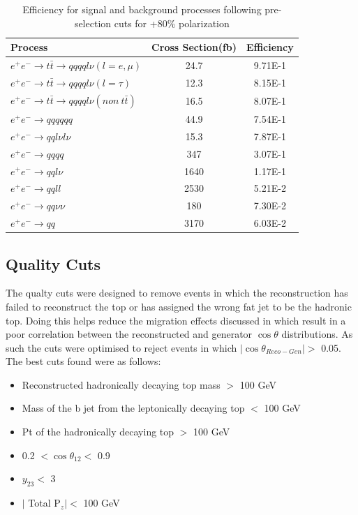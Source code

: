 \begin{table}
  \centering
  \begin{tabular}{l | c | c }
    \toprule
    Process     & Cross Section(fb) & Efficiency \\
    \midrule
     $e^+e^-\rightarrow t\bar{t} \rightarrow qqqql\nu (l=e,\mu)$& 24.7 & 9.71E-1\\
    \midrule
    $e^+e^-\rightarrow t\bar{t} \rightarrow qqqql\nu (l=\tau)$& 12.3 & 8.15E-1\\
    \midrule
    $e^+e^-\rightarrow t\bar{t} \rightarrow qqqql\nu (non ~ t\bar{t})$& 16.5 & 8.07E-1\\
    \midrule
    $e^+e^-\rightarrow qqqqqq$ & 44.9 &  7.54E-1\\
    \midrule
    $e^+e^-\rightarrow qql\nu l\nu$ & 15.3  & 7.87E-1\\
    \midrule
    $e^+e^-\rightarrow qqqq$ & 347 &  3.07E-1\\
    \midrule
    $e^+e^-\rightarrow qql\nu$ & 1640 &  1.17E-1\\
    \midrule
    $e^+e^-\rightarrow qqll$ & 2530 &  5.21E-2\\
    \midrule
    $e^+e^-\rightarrow qq\nu\nu$ & 180 & 7.30E-2 \\
    \midrule
    $e^+e^-\rightarrow qq$ & 3170 & 6.03E-2 \\
    \bottomrule
  \end{tabular}
  \caption{Efficiency for signal and background processes following pre-selection cuts for +80\% polarization}
  \label{table:toppreselpos}
\end{table}

\subsection{Quality Cuts}
\label{Quality Cuts}

The qualty cuts were designed to remove events in which the reconstruction has failed to reconstruct the top or has assigned the wrong fat jet to be the hadronic top. Doing this helps reduce the migration effects discussed in  which result in a poor correlation between the reconstructed and generator $\cos\theta$ distributions. As such the cuts were optimised to reject events in which $|\cos\theta_{Reco-Gen}| > $ 0.05. The best cuts found were as follows:

\begin{itemize}
\item Reconstructed hadronically decaying top mass $>$ 100 GeV
\item Mass of the b jet from the leptonically decaying top $<$ 100 GeV
\item Pt of the hadronically decaying top $>$ 100 GeV
\item 0.2 $< \cos\theta_{12} <$ 0.9
\item $y_{23} <$ 3
\item $\mid$ Total P$_z \mid <$ 100 GeV
\end{itemize}

